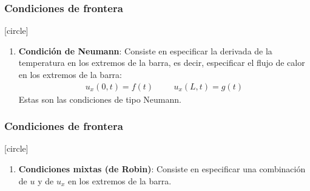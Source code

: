 \begin{frame}
\frametitle{Condiciones de frontera}
[circle]
\begin{enumerate}
\conti
\item \textbf{Condición de Neumann}: Consiste en especificar la derivada de la temperatura en los extremos de la barra, es decir, especificar el flujo de calor en los extremos de la barra:
\begin{align}
u_{x}(0,t) = f(t) \hspace{1cm} u_{x}(L,t) = g(t)
\label{eq:ecuacion_06_02_04}    
\end{align}
Estas son las condiciones de tipo Neumann.
\seti
\end{enumerate}
\end{frame}
\begin{frame}
\frametitle{Condiciones de frontera}
[circle]
\begin{enumerate}
\conti
\item \textbf{Condiciones mixtas (de Robin)}: Consiste en especificar una combinación de $u$ y de $u_{x}$ en los extremos de la barra.
\end{enumerate}
\end{frame}
